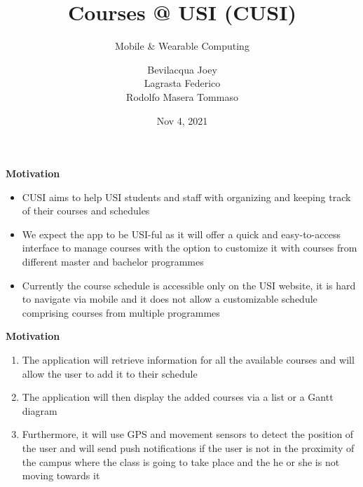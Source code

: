 \documentclass[t,aspectratio=1610]{beamer}
\title{Courses @ USI (CUSI)}
\subtitle{Mobile \& Wearable Computing}
\author{Bevilacqua Joey \\ Lagrasta Federico \\ Rodolfo Masera Tommaso}
\institute{Universit\`a della Svizzera Italiana\\ Faculty of Informatics\\ \href{http://www.unisi.ch}{www.unisi.ch}}
\date{Nov 4, 2021}
\begin{document}
{

\begin{frame}
\maketitle
\end{frame}
}

{

\begin{frame}
\textbf{Motivation} \\

\begin{itemize}
\item CUSI aims to help USI students and staff with organizing and keeping track of their courses and schedules
\pause
\item We expect the app to be USI-ful as it will offer a quick and easy-to-access interface to manage courses with the option to customize it with courses from different master and bachelor programmes
\pause
\item Currently the course schedule is accessible only on the USI website, it is hard to navigate via mobile and it does not allow a customizable schedule comprising courses from multiple programmes
\end{itemize}
\end{frame}
}

{
\begin{frame}
\textbf{Motivation} \\

\begin{enumerate}
\item The application will retrieve information for all the available courses and will allow the user to add it to their schedule
\pause
\item The application will then display the added courses via a list or a Gantt diagram
\pause
\item Furthermore, it will use GPS and movement sensors to detect the position of the user and will send push notifications if the user is not in the proximity of the campus where the class is going to take place and the he or she is not moving towards it 
\end{enumerate}
\end{frame}
}
\end{document}

